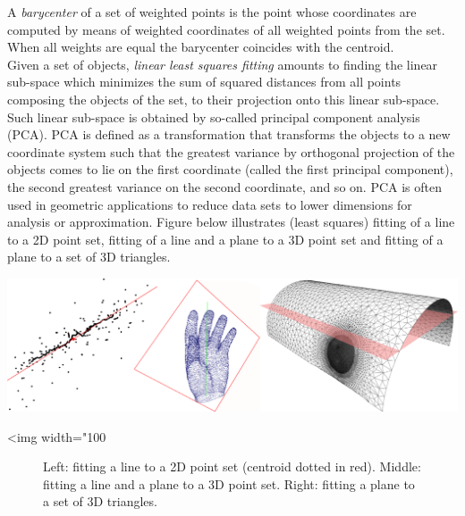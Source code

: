 A \emph{barycenter} of a set of weighted points is the point whose coordinates are computed by means of weighted coordinates of all weighted points from the set. When all weights are equal the barycenter coincides with the centroid.\\

Given a set of objects, \emph{linear least squares fitting} amounts to finding the linear sub-space which minimizes the sum of squared distances from all points composing the objects of the set, to their projection onto this linear sub-space. Such linear sub-space is obtained by so-called principal component analysis (PCA). PCA is defined as a transformation that transforms the objects to a new coordinate system such that the greatest variance by orthogonal projection of the objects comes to lie on the first coordinate (called the first principal component), the second greatest variance on the second coordinate, and so on. PCA is often used in geometric applications to reduce data sets to lower dimensions for analysis or approximation. Figure below illustrates (least squares) fitting of a line to a 2D point set, fitting of a line and a plane to a 3D point set and fitting of a plane to a set of 3D triangles. 

\begin{center}
    \label{fit}
    \begin{ccTexOnly}
      \includegraphics[width=1.0\textwidth]{Principal_component_analysis/fit}
    \end{ccTexOnly}
    \begin{ccHtmlOnly}
        <img width="100%
    \end{ccHtmlOnly}
    \begin{figure}[h]
        \caption{Left: fitting a line to a 2D point set (centroid dotted in red).
                 Middle: fitting a line and a plane to a 3D point set.
                 Right: fitting a plane to a set of 3D triangles.}
    \end{figure}
\end{center}

